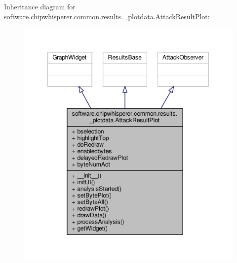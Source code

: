 Inheritance diagram for software.\+chipwhisperer.\+common.\+results.\+\_\+plotdata.\+Attack\+Result\+Plot\+:\nopagebreak
\begin{figure}[H]
\begin{center}
\leavevmode
\includegraphics[width=349pt]{db/d52/classsoftware_1_1chipwhisperer_1_1common_1_1results_1_1__plotdata_1_1AttackResultPlot__inherit__graph}
\end{center}
\end{figure}



